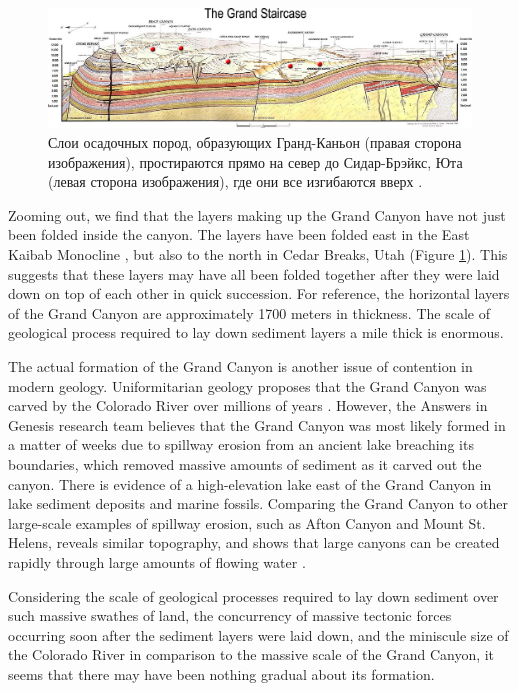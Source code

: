 \documentclass[10pt,twocolumn,letterpaper]{article}
\begin{document}
\begin{figure}
\begin{center}
\includegraphics[width=1\textwidth]{Grand_Staircase-big.jpg}
\end{center}
   \caption{Слои осадочных пород, образующих Гранд-Каньон (правая сторона изображения), простираются прямо на север до Сидар-Брэйкс, Юта (левая сторона изображения), где они все изгибаются вверх \cite{50}.}
\label{fig:4}
\end{figure}

Zooming out, we find that the layers making up the Grand Canyon have not just been folded inside the canyon. The layers have been folded east in the East Kaibab Monocline \cite{46}, but also to the north in Cedar Breaks, Utah (Figure \ref{fig:4}). This suggests that these layers may have all been folded together after they were laid down on top of each other in quick succession. For reference, the horizontal layers of the Grand Canyon are approximately 1700 meters in thickness. The scale of geological process required to lay down sediment layers a mile thick is enormous.

The actual formation of the Grand Canyon is another issue of contention in modern geology. Uniformitarian geology proposes that the Grand Canyon was carved by the Colorado River over millions of years \cite{47}. However, the Answers in Genesis research team believes that the Grand Canyon was most likely formed in a matter of weeks due to spillway erosion from an ancient lake breaching its boundaries, which removed massive amounts of sediment as it carved out the canyon. There is evidence of a high-elevation lake east of the Grand Canyon in lake sediment deposits and marine fossils. Comparing the Grand Canyon to other large-scale examples of spillway erosion, such as Afton Canyon and Mount St. Helens, reveals similar topography, and shows that large canyons can be created rapidly through large amounts of flowing water \cite{48}.

Considering the scale of geological processes required to lay down sediment over such massive swathes of land, the concurrency of massive tectonic forces occurring soon after the sediment layers were laid down, and the miniscule size of the Colorado River in comparison to the massive scale of the Grand Canyon, it seems that there may have been nothing gradual about its formation.
\end{document}
